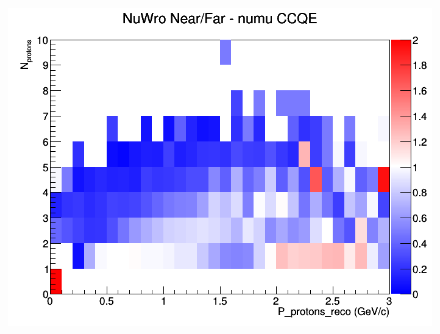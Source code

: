 \begin{figure}[h]
\endminipage
{}
\includegraphics[width=\linewidth]{eff_N_P/FGT/protons/ratios/CCQE_NuWro_numu_NF_N_P.png}
\endminipage
\newline
\end{figure}
\clearpage
